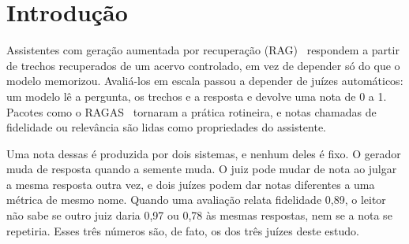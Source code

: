 \documentclass[12pt]{article}
\begin{document}
\renewcommand{\abstractname}{Abstract}
\begin{abstract}
\noindent
Retrieval-augmented assistants are commonly scored by automatic judges whose
metrics share names but not definitions. We ask how much of such a score belongs
to the answer and how much to the judge. In an exploratory, single-question
study, five answers produced by one generator under different seeds and
identical retrieved passages are judged three times by three frameworks (RAGAS,
DeepEval and JevEval), compared pairwise in both orders, and regenerated under
four pipeline mutants plus a null mutant. For answer-level metrics, variation
across answers exceeds variation across repeated judgments for every judge, and
only two verdicts flip. Judges nevertheless disagree widely: context relevance
for the very same passages ranges from 0.17 to 1.00. Two incomplete answers
obtain perfect faithfulness from RAGAS and DeepEval, and only reference-based
correctness separates them. Reversing the order preserves the pairwise winner in
6 and 8 of 10 pairs. Every mutant is killed by some judge, yet a single judge
kills all four, three of the eight kills hold by one answer, and the null mutant
shows that an uncontrolled kill criterion would count judge noise as detection.

\medskip
\noindent\textbf{Keywords:} retrieval-augmented generation; automatic
evaluation; LLM-as-a-judge; pairwise comparison; mutation testing.
\end{abstract}
\renewcommand{\abstractname}{Resumo}

\section{Introdução}

Assistentes com geração aumentada por recuperação (RAG)~\cite{lewis2020rag}
respondem a partir de trechos recuperados de um acervo controlado, em vez de
depender só do que o modelo memorizou. Avaliá-los em escala passou a depender de
juízes automáticos: um modelo lê a pergunta, os trechos e a resposta e devolve
uma nota de 0 a 1. Pacotes como o RAGAS~\cite{es2024ragas} tornaram a prática
rotineira, e notas chamadas de fidelidade ou relevância são lidas como
propriedades do assistente.

Uma nota dessas é produzida por dois sistemas, e nenhum deles é fixo. O gerador
muda de resposta quando a semente muda. O juiz pode mudar de nota ao julgar a
mesma resposta outra vez, e dois juízes podem dar notas diferentes a uma métrica
de mesmo nome. Quando uma avaliação relata fidelidade 0,89, o leitor não sabe se
outro juiz daria 0,97 ou 0,78 às mesmas respostas, nem se a nota se repetiria.
Esses três números são, de fato, os dos três juízes deste estudo.
\end{document}
